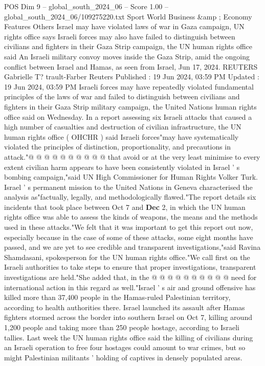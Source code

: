 \begin{textsample}{POS Dim 9 – global\_south\_2024\_06 – Score 1.00 – global\_south\_2024\_06/109275220.txt}  \label{ex:f9_pos_057}
Sport World Business \&amp ; Economy Features Others Israel may have violated laws of war in Gaza campaign, UN rights office says Israeli forces may also have failed to distinguish between civilians and fighters in their Gaza Strip campaign, the UN human rights office said An Israeli military convoy moves inside the Gaza Strip, amid the ongoing conflict between Israel and Hamas, as seen from Israel, Jun 17, 2024.
REUTERS Gabrielle T? trault-Farber Reuters Published : 19 Jun 2024, 03:59 PM Updated : 19 Jun 2024, 03:59 PM Israeli forces may have repeatedly violated fundamental principles of the laws of war and failed to distinguish between civilians and fighters in their Gaza Strip military campaign, the United Nations human rights office said on Wednesday.
In a report assessing six Israeli attacks that caused a high number of casualties and destruction of civilian infrastructure, the UN human rights office ( OHCHR ) said Israeli forces"may have systematically violated the principles of distinction, proportionality, and precautions in attack."@ @ @ @ @ @ @ @ @ @ that avoid or at the very least minimise to every extent civilian harm appears to have been consistently violated in Israel ' s bombing campaign,"said UN High Commissioner for Human Rights Volker Turk.
Israel ' s permanent mission to the United Nations in Geneva characterised the analysis as"factually, legally, and methodologically flawed."The report details six incidents that took place between Oct 7 and \textbf{Dec} 2, in which the UN human rights office was able to assess the kinds of weapons, the means and the methods used in these attacks."We felt that it was important to get this report out now, especially because in the case of some of these attacks, some eight months have passed, and we are yet to see credible and transparent investigations,"said Ravina Shamdasani, spokesperson for the UN human rights office."We call first on the Israeli authorities to take steps to ensure that proper investigations, transparent investigations are held."She added that, in the @ @ @ @ @ @ @ @ @ @ need for international action in this regard as well."Israel ' s air and ground offensive has killed more than 37,400 people in the Hamas-ruled Palestinian territory, according to health authorities there.
Israel launched its assault after Hamas fighters stormed across the border into southern Israel on Oct 7, killing around 1,200 people and taking more than 250 people hostage, according to Israeli tallies.
Last week the UN human rights office said the killing of civilians during an Israeli operation to free four hostages could amount to war crimes, but so might Palestinian militants ' holding of captives in densely populated areas.

\end{textsample}
